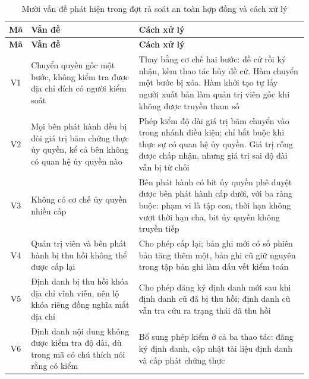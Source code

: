 \begin{longtable}{|c|p{4.1cm}|p{8.3cm}|}
\caption{Mười vấn đề phát hiện trong đợt rà soát an toàn hợp đồng và cách xử lý}
\label{tab:contract-audit} \\

\hline
\textbf{Mã} & \textbf{Vấn đề} & \textbf{Cách xử lý} \\
\hline
\endfirsthead

\hline
\textbf{Mã} & \textbf{Vấn đề} & \textbf{Cách xử lý} \\
\hline
\endhead

\hline
\endfoot

\hline
\endlastfoot

V1 & Chuyển quyền gốc một bước, không kiểm tra được địa chỉ đích có người kiểm soát
& Thay bằng cơ chế hai bước: đề cử rồi ký nhận, kèm thao tác hủy đề cử. Hàm chuyển một bước bị xóa. Hàm khởi tạo tự lấy người xuất bản làm quản trị viên gốc khi không được truyền tham số
\\ \hline

V2 & Mọi bên phát hành đều bị đòi giá trị băm chứng thực ủy quyền, kể cả bên không có quan hệ ủy quyền nào
& Phép kiểm độ dài giá trị băm chuyển vào trong nhánh điều kiện; chỉ bắt buộc khi thực sự có quan hệ ủy quyền. Giá trị rỗng được chấp nhận, nhưng giá trị sai độ dài vẫn bị từ chối
\\ \hline

V3 & Không có cơ chế ủy quyền nhiều cấp
& Bên phát hành có bit ủy quyền phê duyệt được bên phát hành cấp dưới, với ba ràng buộc: phạm vi là tập con, thời hạn không vượt thời hạn cha, bit ủy quyền không truyền tiếp
\\ \hline

V4 & Quản trị viên và bên phát hành bị thu hồi không thể được cấp lại
& Cho phép cấp lại; bản ghi mới có số phiên bản tăng thêm một, bản ghi cũ giữ nguyên trong tập bản ghi làm dấu vết kiểm toán
\\ \hline

V5 & Định danh bị thu hồi khóa địa chỉ vĩnh viễn, nên lộ khóa riêng đồng nghĩa mất địa chỉ
& Cho phép đăng ký định danh mới sau khi định danh cũ đã bị thu hồi; định danh cũ vẫn tra cứu ra trạng thái đã thu hồi
\\ \hline

V6 & Định danh nội dung không được kiểm tra độ dài, dù trong mã có chú thích nói rằng có kiểm
& Bổ sung phép kiểm ở cả ba thao tác: đăng ký định danh, cập nhật tài liệu định danh và cấp phát chứng thực
\\ \hline


\end{longtable}
